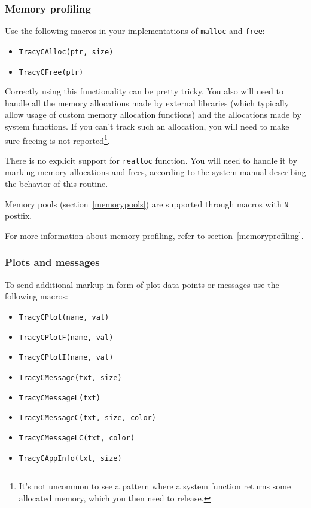 \documentclass[hidelinks,titlepage,a4paper,twoside]{article}
\begin{document}
\subsubsection{Memory profiling}
\label{cmemoryprofiling}

Use the following macros in your implementations of \texttt{malloc} and \texttt{free}:

\begin{itemize}
\item \texttt{TracyCAlloc(ptr, size)}
\item \texttt{TracyCFree(ptr)}
\end{itemize}

Correctly using this functionality can be pretty tricky. You also will need to handle all the memory allocations made by external libraries (which typically allow usage of custom memory allocation functions) and the allocations made by system functions. If you can't track such an allocation, you will need to make sure freeing is not reported\footnote{It's not uncommon to see a pattern where a system function returns some allocated memory, which you then need to release.}.

There is no explicit support for \texttt{realloc} function. You will need to handle it by marking memory allocations and frees, according to the system manual describing the behavior of this routine.

Memory pools (section~\ref{memorypools}) are supported through macros with \texttt{N} postfix.

For more information about memory profiling, refer to section~\ref{memoryprofiling}.

\subsubsection{Plots and messages}

To send additional markup in form of plot data points or messages use the following macros:

\begin{itemize}
\item \texttt{TracyCPlot(name, val)}
\item \texttt{TracyCPlotF(name, val)}
\item \texttt{TracyCPlotI(name, val)}
\item \texttt{TracyCMessage(txt, size)}
\item \texttt{TracyCMessageL(txt)}
\item \texttt{TracyCMessageC(txt, size, color)}
\item \texttt{TracyCMessageLC(txt, color)}
\item \texttt{TracyCAppInfo(txt, size)}
\end{itemize}
\end{document}
